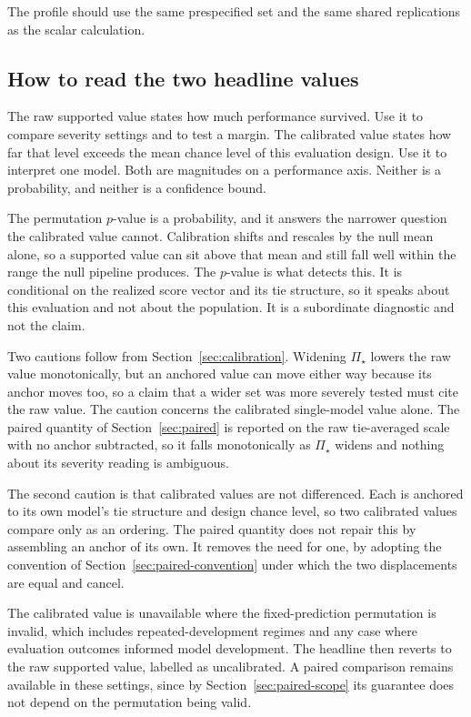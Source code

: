 \documentclass[11pt]{article}
\newcommand{\PSet}{\Pi_\star}
\theoremstyle{remark}
\begin{document}
The profile should use the same prespecified set and the same shared replications as the scalar calculation.

\subsection{How to read the two headline values}

The raw supported value states how much performance survived. Use it to compare severity settings and to test a margin. The calibrated value states how far that level exceeds the mean chance level of this evaluation design. Use it to interpret one model. Both are magnitudes on a performance axis. Neither is a probability, and neither is a confidence bound.

The permutation $p$-value is a probability, and it answers the narrower question the calibrated value cannot. Calibration shifts and rescales by the null mean alone, so a supported value can sit above that mean and still fall well within the range the null pipeline produces. The $p$-value is what detects this. It is conditional on the realized score vector and its tie structure, so it speaks about this evaluation and not about the population. It is a subordinate diagnostic and not the claim.

Two cautions follow from Section~\ref{sec:calibration}. Widening $\PSet$ lowers the raw value monotonically, but an anchored value can move either way because its anchor moves too, so a claim that a wider set was more severely tested must cite the raw value. The caution concerns the calibrated single-model value alone. The paired quantity of Section~\ref{sec:paired} is reported on the raw tie-averaged scale with no anchor subtracted, so it falls monotonically as $\PSet$ widens and nothing about its severity reading is ambiguous.

The second caution is that calibrated values are not differenced. Each is anchored to its own model's tie structure and design chance level, so two calibrated values compare only as an ordering. The paired quantity does not repair this by assembling an anchor of its own. It removes the need for one, by adopting the convention of Section~\ref{sec:paired-convention} under which the two displacements are equal and cancel.

The calibrated value is unavailable where the fixed-prediction permutation is invalid, which includes repeated-development regimes and any case where evaluation outcomes informed model development. The headline then reverts to the raw supported value, labelled as uncalibrated. A paired comparison remains available in these settings, since by Section~\ref{sec:paired-scope} its guarantee does not depend on the permutation being valid.
\end{document}
